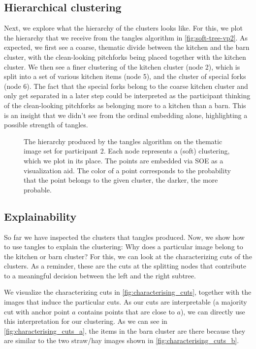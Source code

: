 \FloatBarrier
\subsection{Hierarchical clustering}
Next, we explore what the hierarchy of the clusters looks like.
For this, we plot the hierarchy that we receive from the tangles algorithm in \autoref{fig:soft-tree-vp2}. 
As expected, we first see a coarse, thematic divide between the kitchen and the barn cluster, with 
the clean-looking pitchforks being placed together with the kitchen cluster. 
We then see a finer clustering of the kitchen cluster (node 2), which is split into a set of various kitchen items (node 5), and the cluster of special forks (node 6). 
The fact that the special forks belong to the coarse kitchen cluster and only get separated in a later step could be interpreted as the participant thinking of the 
clean-looking pitchforks as belonging more to a kitchen than a barn. This is an insight that we didn't see from the ordinal embedding alone,
highlighting a possible strength of tangles.

\begin{figure}[ht]
    \centering
    \caption{
        The hierarchy produced by the tangles algorithm on the thematic image set for participant 2. 
        Each node represents a (soft) clustering, which we plot in its place. The points are embedded via SOE as a visualization aid.
        The color of a point corresponds to the probability that the point belongs to the given cluster, the darker, the more probable. 
    }
    \label{fig:soft-tree-vp2}
\end{figure}

\subsection{Explainability}\label{real-explain}
So far we have inspected the clusters that tangles produced. Now, we show how to use tangles to explain the clustering:
Why does a particular image belong to the kitchen or barn cluster? For this, we can look at the characterizing cuts of the clusters. As a reminder, 
these are the cuts at the splitting nodes that contribute to a meaningful decision between the left and the right subtree.

We visualize the characterizing cuts in \autoref{fig:characterising_cuts}, together with the images that induce the particular cuts. As our cuts are interpretable (a majority cut 
with anchor point $a$ contains points that are close to $a$), we can directly use this interpretation for our clustering. As we can see in \autoref{fig:characterising_cuts_a}, 
the items in the barn cluster are there because they are similar to the two straw/hay images shown in \autoref{fig:characterising_cuts_b}. 

